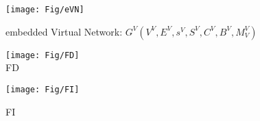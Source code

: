 \begin{figure}
\centering
\texttt{[image: Fig/eVN]}\\
\caption{embedded Virtual Network: $G^V (V^V,E^V,s^V,S^V,C^V,B^V,M^V_V)$}\label{fig:eVN}
\end{figure}

\begin{figure}
\centering
\begin{minipage}[t]{0.5\linewidth}
\centering
\texttt{[image: Fig/FD]}\\
\caption{ FD}\label{fig:FD}
\end{minipage}
\hfill
\begin{minipage}[t]{0.5\linewidth}
\centering
\texttt{[image: Fig/FI]}\\
\caption{FI}\label{fig:FI}
\end{minipage}
\end{figure}




